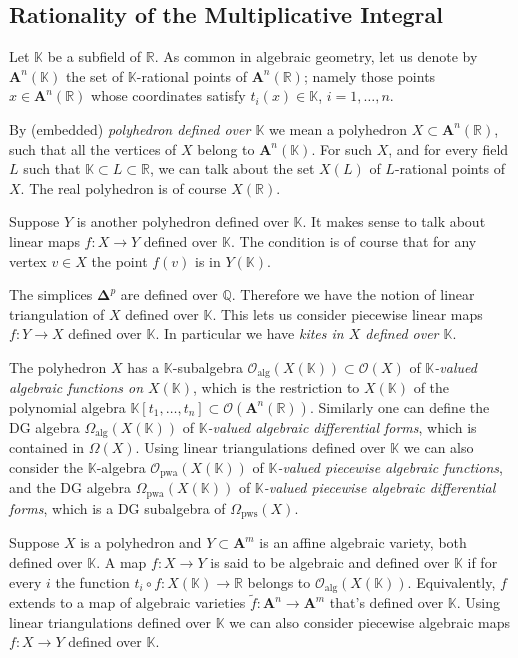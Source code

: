 \documentclass[10pt, a4paper]{amsart}
\theoremstyle{definition}
\numberwithin{equation}{section}
\newcommand{\mcal}[1]{\mathcal{#1}}
\newcommand{\mbf}[1]{\mathbf{#1}}
\newcommand{\mrm}[1]{\mathrm{#1}}
\newcommand{\mbb}[1]{\mathbb{#1}}
\newcommand{\bsym}[1]{\boldsymbol{#1}}
\newcommand{\til}[1]{\tilde{#1}}
\newcommand{\K}{\mbb{K}}
\newcommand{\R}{\mbb{R}}
\begin{document}
 
\subsection{Rationality of the Multiplicative Integral} \label{subsec:ration}
Let $\K$ be a subfield of $\R$. As common in algebraic geometry, let us denote
by $\mbf{A}^n(\K)$ the set of $\K$-rational points of $\mbf{A}^n(\R)$; namely
those points $x \in \mbf{A}^n(\R)$ whose coordinates satisfy $t_i(x) \in \K$,
$i = 1, \ldots, n$. 

By (embedded) {\em polyhedron defined over $\K$} we mean a polyhedron 
$X \subset \mbf{A}^n(\R)$, such that all the
vertices of $X$ belong to $\mbf{A}^n(\K)$. 
For such $X$, and for every field $L$ such that $\K \subset L \subset \R$, we
can talk about the set $X(L)$ of $L$-rational points of $X$.
The real polyhedron is of course $X(\R)$.

Suppose $Y$ is another polyhedron defined over $\K$. It makes sense to talk
about linear maps $f : X \to Y$ defined over $\K$. The condition is of course
that for any vertex $v \in X$ the point $f(v)$ is in $Y(\K)$. 

The simplices $\bsym{\Delta}^p$ are defined over $\mbb{Q}$. Therefore we have
the notion of linear triangulation of $X$ defined over $\K$. This lets 
us consider piecewise linear maps $f : Y \to X$ defined over $\K$.
In particular we have {\em kites in $X$ defined over
$\K$}. 

The polyhedron $X$ has a $\K$-subalgebra 
$\mcal{O}_{\mrm{alg}}(X(\K)) \subset \mcal{O}(X)$
of {\em $\K$-valued algebraic functions on $X(\K)$}, which is the restriction
to  $X(\K)$ of the polynomial algebra 
$\K[t_1, \ldots, t_n] \subset \mcal{O}(\mbf{A}^n(\R))$. 
Similarly one can define the DG algebra
$\Omega_{\mrm{alg}}(X(\K))$ of {\em $\K$-valued algebraic differential forms},
which is contained in $\Omega(X)$.
Using linear triangulations defined over $\K$ we can also consider the 
$\K$-algebra $\mcal{O}_{\mrm{pwa}}(X(\K))$ of {\em $\K$-valued piecewise
algebraic functions}, and the DG
algebra $\Omega_{\mrm{pwa}}(X(\K))$ of {\em $\K$-valued piecewise algebraic
differential forms}, which is a DG subalgebra of $\Omega_{\mrm{pws}}(X)$.

Suppose $X$ is a polyhedron and $Y \subset \mbf{A}^m$ is an
affine algebraic variety, both defined over $\K$. 
A map $f : X \to Y$ is said to be algebraic and defined over $\K$ if
for every $i$ the function $t_i \circ f : X(\K) \to \R$ belongs to
$\mcal{O}_{\mrm{alg}}(X(\K))$. Equivalently, $f$ extends to a map of algebraic
varieties $\til{f} : \mbf{A}^n \to \mbf{A}^m$ that's defined over $\K$.
Using linear triangulations defined over $\K$ we can also consider 
piecewise algebraic maps $f : X \to Y$ defined over $\K$. 
\end{document}
